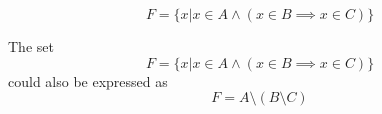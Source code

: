 \documentclass[main.tex]{subfiles}
\begin{document}
\subproblem{}\label{7c}

\[F = \{x | x \in A \land (x \in B \implies x \in C)\}\]
\begin{remark}
	The set
	\[F = \{x | x \in A \land (x \in B \implies x \in C)\}\]
	could also be expressed as
	\[F = A \setminus (B \setminus C)\]
\end{remark}
\end{document}
